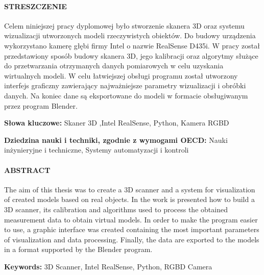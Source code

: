 \documentclass{pginz}
\providecommand{\keywordspl}[1]
{
  \small	
  \textbf{Słowa kluczowe:} #1
}
\providecommand{\keywordseng}[1]
{
  \small	
  \textbf{Keywords:}  #1
}
\providecommand{\dnauki}[1]
{
  \small	
  \textbf{Dziedzina nauki i techniki, zgodnie z wymogami OECD:} #1
}
\begin{document}




\setcounter{page}{3}

 
\paragraph{STRESZCZENIE\newline}

\newline \indent Celem niniejszej pracy dyplomowej było stworzenie skanera 3D oraz systemu wizualizacji utworzonych modeli rzeczywistych obiektów. Do budowy urządzenia wykorzystano kamerę głębi firmy Intel o nazwie RealSense D435i. W pracy został przedstawiony sposób budowy skanera 3D, jego kalibracji oraz algorytmy służące do przetwarzania otrzymanych danych pomiarowych w celu uzyskania wirtualnych modeli. W celu łatwiejszej obsługi programu został utworzony interfejs graficzny zawierający najważniejsze parametry wizualizacji i obróbki danych. Na koniec dane są eksportowane do modeli w formacie obsługiwanym przez program Blender.
\keywordspl{Skaner 3D ,Intel RealSense, Python, Kamera RGBD}
\dnauki{Nauki inżynieryjne i techniczne, Systemy automatyzacji i kontroli }

\newpage
 
\paragraph{ABSTRACT\newline}

The aim of this thesis was to create a 3D scanner and a system for visualization of created models based on real objects. In the work is presented how to build a 3D scanner, its calibration and algorithms used to process the obtained measurement data to obtain virtual models. In order to make the program easier to use, a graphic interface was created containing the most important parameters of visualization and data processing. Finally, the data are exported to the models in a format supported by the Blender program.

\keywordseng{3D Scanner, Intel RealSense, Python, RGBD Camera}
\newpage
\tableofcontents


\newpage
\renewcommand{\tablename}{Tabela}








\renewcommand{\listtablename}{Spis tabel}
\renewcommand{\listfigurename}{Spis rysunków}
\listoffigures
\listoftables




\end{document}
